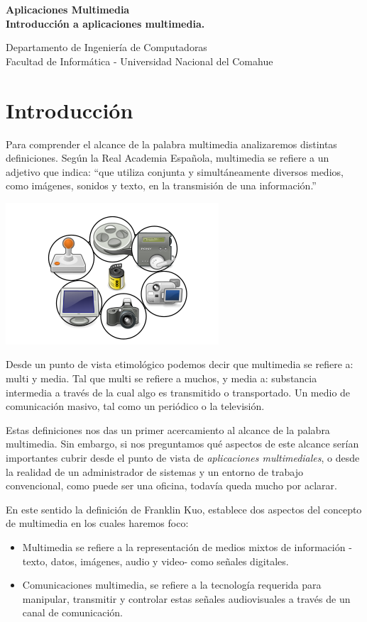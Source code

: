 \documentclass[12pt]{article}
\def\maketitle{

 \makeatletter
 {\color{bl} \centering \huge \sc \textbf{
  Aplicaciones Multimedia\\ 
\large \vspace*{-8pt} \color{black}Introducción a aplicaciones multimedia. 
 \vspace*{8pt} }\par}
 \makeatother

\makeatletter
 {\centering \small 
 	Departamento de Ingeniería de Computadoras \\
 	Facultad de Informática - Universidad Nacional del Comahue \\
 	\vspace{20pt} }
 \makeatother

}
\begin{document}
\thispagestyle{empty}
\maketitle
\setlength{\parindent}{0pt}

\section*{Introducción}

Para comprender el alcance de la palabra multimedia analizaremos distintas 
definiciones. Según la Real Academia Española, multimedia se refiere a un 
adjetivo que indica: ``que utiliza conjunta y simultáneamente diversos 
medios, como imágenes, sonidos y texto, en la transmisión de una 
información.''\cite{raemm}

\begin{center}
\includegraphics{multimedia.png}
\end{center}

Desde un punto de vista etimológico podemos decir que multimedia se 
refiere a: multi y media. Tal que multi se refiere a  muchos, y media a: 
substancia intermedia a través de la cual algo es transmitido o 
transportado. Un medio de comunicación masivo, tal como un periódico o 
la televisión.\cite{ramyer}

Estas definiciones nos das un primer acercamiento al alcance de la palabra
multimedia. Sin embargo, si nos preguntamos qué aspectos de este alcance 
serían importantes cubrir desde el punto de vista de {\it aplicaciones 
multimediales}, o desde la realidad de un administrador de sistemas y un 
entorno de trabajo convencional, como puede ser una oficina, todavía queda
mucho por aclarar. 

En este sentido la definición de Franklin Kuo, establece dos aspectos del
concepto de multimedia en los cuales haremos foco:

\begin{itemize}
\item Multimedia se refiere a la representación de medios mixtos de información
-texto, datos, imágenes, audio y video- como señales digitales. 
\item Comunicaciones multimedia, se refiere a la tecnología requerida para 
manipular, transmitir y controlar estas señales audiovisuales a través de un 
canal de comunicación.\cite{frankuo}
\end{itemize}
\end{document}
